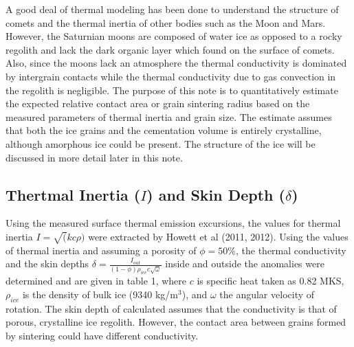 \documentclass[11pt]{article} %
\begin{document}
	A good deal of thermal modeling has been done to understand the structure of comets and the thermal inertia of other bodies such as the Moon and Mars. However, the Saturnian moons are composed of water ice as opposed to a rocky regolith and lack the dark organic layer which found on the surface of comets. Also, since the moons lack an atmosphere the thermal conductivity is dominated by intergrain contacts while the thermal conductivity due to gas convection in the regolith is negligible. The purpose of this note is to quantitatively estimate the expected relative contact area or grain sintering radius based on the measured parameters of thermal inertia and grain size. The estimate assumes that both the ice grains and the cementation volume is entirely crystalline, although amorphous ice could be present. The structure of the ice will be discussed in more detail later in this note. 
	

\subsection{Thertmal Inertia ($I$) and Skin Depth ($\delta$)}

		Using the measured surface thermal emission excursions, the values for thermal inertia $I=\sqrt(kc\rho)$ were extracted by Howett et al (2011, 2012). Using the values of thermal inertia and assuming a porosity of $\phi = 50\%$, the thermal conductivity and the skin depths $\delta = \frac{I_{out}}{(1-\phi)\rho_{ice} c \sqrt{\omega}}$ inside and outside the anomalies were determined and are given in table 1, where $c$ is specific heat taken as 0.82 MKS, $\rho_{ice}$ is the density of bulk ice (9340 kg/m$^{3}$), and $\omega$ the angular velocity of rotation. The skin depth of calculated assumes that the conductivity is that of porous, crystalline ice regolith. However, the contact area between grains formed by sintering could have different conductivity. 
\end{document}
